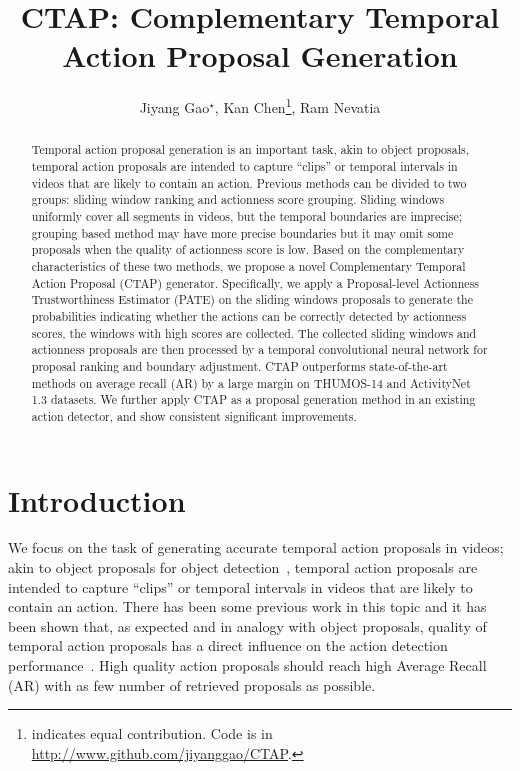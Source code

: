 \documentclass[runningheads]{llncs}
\begin{document}
\title{CTAP: Complementary Temporal Action Proposal Generation} 


\author{Jiyang Gao$^\star$,
Kan Chen\thanks{indicates equal contribution. Code is in {\url{http://www.github.com/jiyanggao/CTAP}}.},
Ram Nevatia}


\maketitle              \begin{abstract}
Temporal action proposal generation is an important task, akin to object proposals, temporal action proposals are intended to capture ``clips'' or temporal intervals in videos that are likely to contain an action. Previous methods can be divided to two groups: sliding window ranking and actionness score grouping. Sliding windows uniformly cover all segments in videos, but the temporal boundaries are imprecise; grouping based method may have more precise boundaries but it may omit some proposals when the quality of actionness score is low. Based on the complementary characteristics of these two methods, we propose a novel Complementary Temporal Action Proposal (CTAP) generator. Specifically, we apply a Proposal-level Actionness Trustworthiness Estimator (PATE) on the sliding windows proposals to generate the probabilities indicating whether the actions can be correctly detected by actionness scores, the windows with high scores are collected. The collected sliding windows and actionness proposals are then processed by a temporal convolutional neural network for proposal ranking and boundary adjustment. CTAP outperforms state-of-the-art methods on average recall (AR) by a large margin on THUMOS-14 and ActivityNet 1.3 datasets. We further apply CTAP as a proposal generation method in an existing action detector, and show consistent significant improvements. 
\end{abstract}


\section{Introduction}\label{sec: intro}

We focus on the task of generating accurate temporal action proposals in videos; akin to object proposals for object detection~\cite{ren2015faster}, temporal action proposals are intended to capture ``clips'' or temporal intervals in videos that are likely to contain an action. There has been some previous work in this topic and it has been shown that, as expected and in analogy with object proposals, quality of temporal action proposals has a direct influence on the action detection performance~\cite{Gao_2017_ICCV,Shou_2016_CVPR}. High quality action proposals should reach high Average Recall (AR) with as few number of retrieved proposals as possible. 
\end{document}
